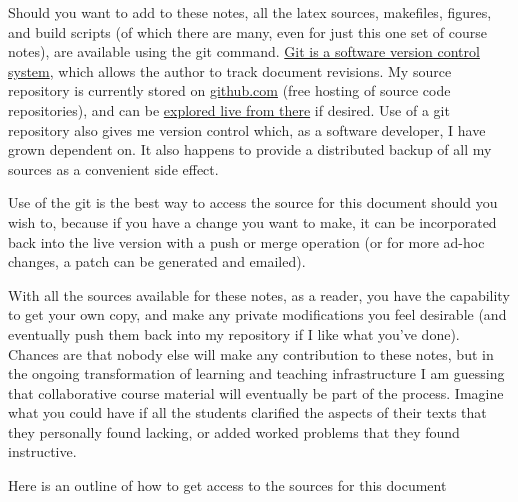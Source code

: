 Should you want to add to these notes, all the latex sources, makefiles, figures, and build scripts (of which there are many, even for just this one set of course notes), are available using the git command.  \href{http://git-scm.com/}{Git is a software version control system}, which allows the author to track document revisions.  My source repository is currently stored on \href{http://github.com}{github.com} (free hosting of source code repositories), and can be \href{https://github.com/peeterjoot/physicsplay/tree/master/notes/phy454}{explored live from there} if desired.  Use of a git repository also gives me version control which, as a software developer, I have grown dependent on.  It also happens to provide a distributed backup of all my sources as a convenient side effect.

Use of the git is the best way to access the source for this document should you wish to, because if you have a change you want to make, it can be incorporated back into the live version with a push or merge operation (or for more ad-hoc changes, a patch can be generated and emailed).

With all the sources available for these notes, as a reader, you have the capability to get your own copy, and make any private modifications you feel desirable (and eventually push them back into my repository if I like what you've done).  Chances are that nobody else will make any contribution to these notes, but in the ongoing transformation of learning and teaching infrastructure I am guessing that collaborative course material will eventually be part of the process.  Imagine what you could have if all the students clarified the aspects of their texts that they personally found lacking, or added worked problems that they found instructive.

Here is an outline of how to get access to the sources for this document

